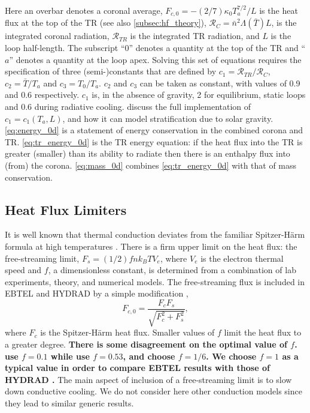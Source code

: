 \documentclass[]{aastex}
\begin{document}
Here an overbar denotes a coronal average, $F_{c,0} = -(2/7)\kappa_0 T_a^{7/2}/L$ is the heat flux at the top of the TR (see also \autoref{subsec:hf_theory}), $\mathcal{R}_C=\bar{n}^2\Lambda(\bar{T})L$, is the integrated coronal radiation, $\mathcal{R}_{TR}$ is the integrated TR radiation, and $L$ is the loop half-length. The subscript ``0'' denotes a quantity at the top of the TR and ``$a$'' denotes a quantity at the loop apex. Solving this set of equations requires the specification of three (semi-)constants that are defined by  $c_1=\mathcal{R}_{TR}/\mathcal{R}_C$, $c_2=\bar{T}/T_a$ and $c_3=T_0/T_a$. $c_2$ and $c_3$ can be taken as constant, with values of 0.9 and 0.6 respectively. $c_1$ is, in the absence of gravity, 2 for equilibrium, static loops and 0.6 during radiative cooling. \citet{cargill_enthalpy-based_2012} discuss the full implementation of $c_1 = c_1(T_a,L)$, and how it can model stratification due to solar gravity. \autoref{eq:energy_0d} is a statement of energy conservation in the combined corona and TR. \autoref{eq:tr_energy_0d} is the TR energy equation: if the heat flux into the TR is greater (smaller) than its ability to radiate then there is an enthalpy flux into (from) the corona. \autoref{eq:mass_0d} combines \autoref{eq:tr_energy_0d} with that of mass conservation.
	
	\subsection{Heat Flux Limiters}
	\label{subsec:hf_theory}
	\par It is well known that thermal conduction deviates from the familiar Spitzer-H{\"a}rm formula \citep{spitzer_transport_1953} at high temperatures \citep[e.g.][]{ljepojevic_heat_1989}. There is a firm upper limit on the heat flux: the free-streaming limit, $F_s=(1/2)fnk_BTV_e$, where $V_e$ is the electron thermal speed and $f$, a dimensionless constant, is determined from a combination of lab experiments, theory, and numerical models. The free-streaming flux is included in EBTEL and HYDRAD by a simple modification \citep{klimchuk_highly_2008},
	\begin{equation}
		F_{c,0} = \frac{F_cF_s}{\sqrt{F_c^2 + F_s^2}},
	\end{equation}
where $F_c$ is the Spitzer-H{\"a}rm heat flux. Smaller values of $f$ limit the heat flux to a greater degree. \textbf{There is some disagreement on the optimal value of $f$. \citet{luciani_nonlocal_1983} use $f=0.1$ while \citet{karpen_nonlocal_1987} use $f=0.53$, and \citet{patsourakos_coronal_2005} choose $f=1/6$. We choose $f = 1$ as a typical value in order to compare EBTEL results with those of HYDRAD \citep[see appendix 5 of][]{bradshaw_influence_2013}.} The main aspect of inclusion of a free-streaming limit is to slow down conductive cooling. We do not consider here other conduction models \citep[e.g. the non-local model discussed in the coronal context by][]{karpen_nonlocal_1987,ciaravella_non-local_1991,west_lifetime_2008} since they lead to similar generic results. 
\end{document}
